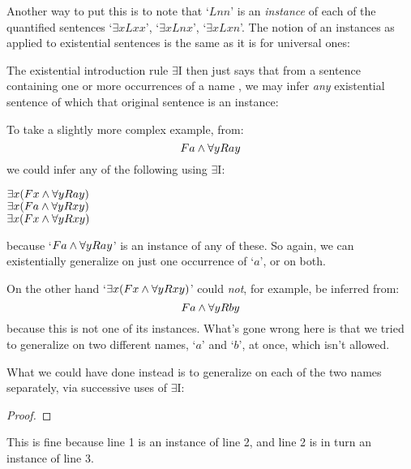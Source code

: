 Another way to put this is to note that `$Lnn$' is an \emph{instance} of each of the quantified sentences `$\exists xLxx$',  `$\exists xLnx$', `$\exists xLxn$'.  The notion of an instances as applied to existential sentences is the same as it is for universal ones:


The existential introduction rule $\exists$I then just says that from a sentence  containing one or more occurrences of a name , we may infer \emph{any} existential sentence of which that original sentence is an instance:


To take a slightly more complex example, from:
$$Fa \wedge \forall yRay$$
we could infer any of the following using $\exists$I:
\begin{center}
$\exists x(Fx \wedge \forall yRay)$\\
$\exists x(Fa \wedge \forall yRxy)$\\
$\exists x(Fx \wedge \forall yRxy)$\\
\end{center}
because `$Fa \wedge \forall yRay$' is an instance of any of these. So again, we can existentially generalize on just one occurrence of `$a$', or on both.

On the other hand `$\exists x(Fx \wedge \forall yRxy)$' could \emph{not}, for example, be inferred from:
$$Fa \wedge \forall yRby$$
because this is not one of its instances.  What's gone wrong here is that we tried to generalize on two different names, `$a$' and `$b$', at once, which isn't allowed.

What we could have done  instead is to generalize on each of the two names separately, via successive uses of $\exists$I:

\begin{proof}
	 
	 
\end{proof}
This is fine because line 1 is an instance of line 2, and line 2 is in turn an instance of line 3.

